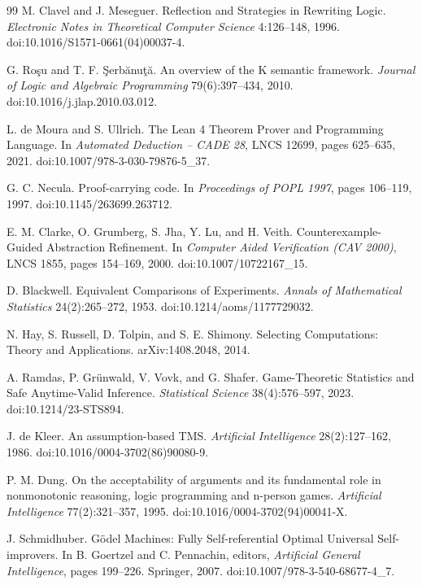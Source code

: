 \begin{thebibliography}{99}
M. Clavel and J. Meseguer. Reflection and Strategies in Rewriting Logic. \emph{Electronic Notes in Theoretical Computer Science} 4:126--148, 1996. doi:10.1016/S1571-0661(04)00037-4.

G. Ro\c{s}u and T. F. \c{S}erb\u{a}nu\c{t}\u{a}. An overview of the K semantic framework. \emph{Journal of Logic and Algebraic Programming} 79(6):397--434, 2010. doi:10.1016/j.jlap.2010.03.012.

L. de Moura and S. Ullrich. The Lean 4 Theorem Prover and Programming Language. In \emph{Automated Deduction -- CADE 28}, LNCS 12699, pages 625--635, 2021. doi:10.1007/978-3-030-79876-5\_37.

G. C. Necula. Proof-carrying code. In \emph{Proceedings of POPL 1997}, pages 106--119, 1997. doi:10.1145/263699.263712.

E. M. Clarke, O. Grumberg, S. Jha, Y. Lu, and H. Veith. Counterexample-Guided Abstraction Refinement. In \emph{Computer Aided Verification (CAV 2000)}, LNCS 1855, pages 154--169, 2000. doi:10.1007/10722167\_15.

D. Blackwell. Equivalent Comparisons of Experiments. \emph{Annals of Mathematical Statistics} 24(2):265--272, 1953. doi:10.1214/aoms/1177729032.

N. Hay, S. Russell, D. Tolpin, and S. E. Shimony. Selecting Computations: Theory and Applications. arXiv:1408.2048, 2014.

A. Ramdas, P. Gr\"unwald, V. Vovk, and G. Shafer. Game-Theoretic Statistics and Safe Anytime-Valid Inference. \emph{Statistical Science} 38(4):576--597, 2023. doi:10.1214/23-STS894.

J. de Kleer. An assumption-based TMS. \emph{Artificial Intelligence} 28(2):127--162, 1986. doi:10.1016/0004-3702(86)90080-9.

P. M. Dung. On the acceptability of arguments and its fundamental role in nonmonotonic reasoning, logic programming and n-person games. \emph{Artificial Intelligence} 77(2):321--357, 1995. doi:10.1016/0004-3702(94)00041-X.

J. Schmidhuber. G\"odel Machines: Fully Self-referential Optimal Universal Self-improvers. In B. Goertzel and C. Pennachin, editors, \emph{Artificial General Intelligence}, pages 199--226. Springer, 2007. doi:10.1007/978-3-540-68677-4\_7.


\end{thebibliography}

